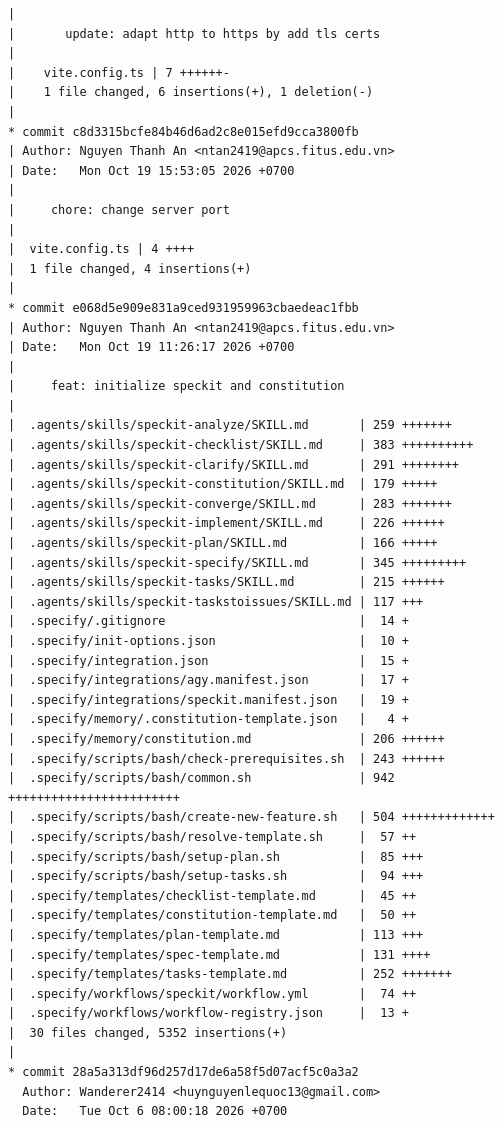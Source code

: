 \documentclass[12pt]{article}
\begin{document}
\begin{lstlisting}[numbers=none,breaklines=true]
|
|       update: adapt http to https by add tls certs
|
|    vite.config.ts | 7 ++++++-
|    1 file changed, 6 insertions(+), 1 deletion(-)
|
* commit c8d3315bcfe84b46d6ad2c8e015efd9cca3800fb
| Author: Nguyen Thanh An <ntan2419@apcs.fitus.edu.vn>
| Date:   Mon Oct 19 15:53:05 2026 +0700
|
|     chore: change server port
|
|  vite.config.ts | 4 ++++
|  1 file changed, 4 insertions(+)
|
* commit e068d5e909e831a9ced931959963cbaedeac1fbb
| Author: Nguyen Thanh An <ntan2419@apcs.fitus.edu.vn>
| Date:   Mon Oct 19 11:26:17 2026 +0700
|
|     feat: initialize speckit and constitution
|
|  .agents/skills/speckit-analyze/SKILL.md       | 259 +++++++
|  .agents/skills/speckit-checklist/SKILL.md     | 383 ++++++++++
|  .agents/skills/speckit-clarify/SKILL.md       | 291 ++++++++
|  .agents/skills/speckit-constitution/SKILL.md  | 179 +++++
|  .agents/skills/speckit-converge/SKILL.md      | 283 +++++++
|  .agents/skills/speckit-implement/SKILL.md     | 226 ++++++
|  .agents/skills/speckit-plan/SKILL.md          | 166 +++++
|  .agents/skills/speckit-specify/SKILL.md       | 345 +++++++++
|  .agents/skills/speckit-tasks/SKILL.md         | 215 ++++++
|  .agents/skills/speckit-taskstoissues/SKILL.md | 117 +++
|  .specify/.gitignore                           |  14 +
|  .specify/init-options.json                    |  10 +
|  .specify/integration.json                     |  15 +
|  .specify/integrations/agy.manifest.json       |  17 +
|  .specify/integrations/speckit.manifest.json   |  19 +
|  .specify/memory/.constitution-template.json   |   4 +
|  .specify/memory/constitution.md               | 206 ++++++
|  .specify/scripts/bash/check-prerequisites.sh  | 243 ++++++
|  .specify/scripts/bash/common.sh               | 942 ++++++++++++++++++++++++
|  .specify/scripts/bash/create-new-feature.sh   | 504 +++++++++++++
|  .specify/scripts/bash/resolve-template.sh     |  57 ++
|  .specify/scripts/bash/setup-plan.sh           |  85 +++
|  .specify/scripts/bash/setup-tasks.sh          |  94 +++
|  .specify/templates/checklist-template.md      |  45 ++
|  .specify/templates/constitution-template.md   |  50 ++
|  .specify/templates/plan-template.md           | 113 +++
|  .specify/templates/spec-template.md           | 131 ++++
|  .specify/templates/tasks-template.md          | 252 +++++++
|  .specify/workflows/speckit/workflow.yml       |  74 ++
|  .specify/workflows/workflow-registry.json     |  13 +
|  30 files changed, 5352 insertions(+)
|
* commit 28a5a313df96d257d17de6a58f5d07acf5c0a3a2
  Author: Wanderer2414 <huynguyenlequoc13@gmail.com>
  Date:   Tue Oct 6 08:00:18 2026 +0700


\end{lstlisting}
\end{document}

